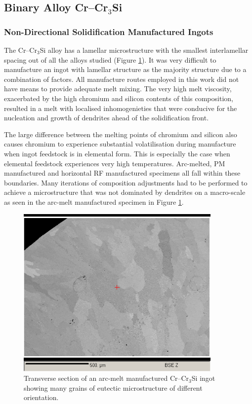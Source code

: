 \subsection{Binary Alloy Cr--Cr$_3$Si}

\subsubsection{Non-Directional Solidification Manufactured Ingots}
The Cr--Cr$_3$Si alloy has a lamellar microstructure with the smallest interlamellar spacing out of all the alloys studied (Figure \ref{fig:Crarctrans}).  It was very difficult to manufacture an ingot with lamellar structure as the majority structure due to a combination of factors.  All manufacture routes employed in this work did not have means to provide adequate melt mixing.  The very high melt viscosity, exacerbated by the high chromium and silicon contents of this composition, resulted in a melt with localised inhomogenieties that were conducive for the nucleation and growth of dendrites ahead of the solidification front. 

The large difference between the melting points of chromium and silicon also causes chromium to experience substantial volatilisation during manufacture when ingot feedstock is in elemental form.  This is especially the case when elemental feedstock experiences very high temperatures.  Arc-melted, PM manufactured and horizontal RF manufactured specimens all fall within these boundaries.  Many iterations of composition adjustments had to be performed to achieve a microstructure that was not dominated by dendrites on a macro-scale as seen in the arc-melt manufactured specimen in Figure \ref{fig:Crarctrans}.

\begin{figure}[H]
\begin{center}
\includegraphics[width=10cm]{Cr_arc_trans}
\caption{Transverse section of an arc-melt manufactured Cr--Cr$_3$Si ingot showing many grains of eutectic microstructure of different orientation.}
\label{fig:Crarctrans}
\end{center}
\end{figure}
%
 
